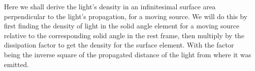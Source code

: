 
Here we shall derive the light's density in an infinitesimal surface area perpendicular to the light's propagation, for a moving source.
We will do this by first finding the density of light in the solid angle element for a moving source relative to the corresponding solid angle in the rest frame, then multiply by the dissipation factor to get the density for the surface element.
With the factor being the inverse square of the propagated distance of the light from where it was emitted.

